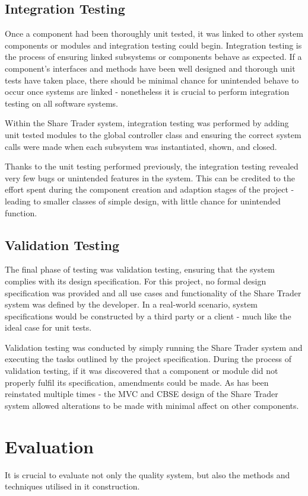 \documentclass[12pt, a4paper,titlepage]{article}
\begin{document}
\subsection{Integration Testing}
Once a component had been thoroughly unit tested, it was linked to other
system components or modules and integration testing could begin. 
Integration testing is the process of ensuring linked subsystems or components
behave as expected.
If a component's interfaces and methods have been well designed and
thorough unit tests have taken place, there should be minimal chance for
unintended behave to occur once systems are linked - nonetheless it is crucial
to perform integration testing on all software systems.  

Within the Share Trader system, integration testing was performed by adding unit
tested modules to the global controller class and ensuring the correct system
calls were made when each subsystem was instantiated, shown, and closed.

Thanks to the unit testing performed previously, the integration testing
revealed very few bugs or unintended features in the system. 
This can be credited to the effort spent during the component creation and
adaption stages of the project - leading to smaller classes of simple design,
with little chance for unintended function.

\subsection{Validation Testing}
The final phase of testing was validation testing, ensuring that the system
complies with its design specification.  
For this project, no formal design specification was provided and all use
cases and functionality  of the Share Trader system was defined by the
developer.  
In a real-world scenario, system specifications would be constructed by a
third party or a client - much like the ideal case for unit tests.  

Validation testing was conducted by simply running the Share Trader system and
executing the tasks outlined by the project specification.
During the process of validation testing, if it was discovered that a
component or module did not properly fulfil its specification, amendments
could be made.
As has been reinstated multiple times - the MVC and CBSE design of the Share
Trader system allowed alterations to be made with minimal affect on other
components.


\section{Evaluation}
It is crucial to evaluate not only the quality system, but also the methods and
techniques utilised in it construction.
\end{document}
